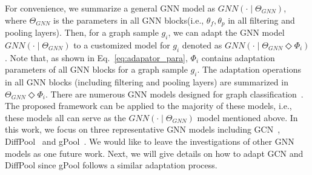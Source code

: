 \documentclass[11pt,dvipdfm]{article}
\begin{document}
For convenience, we summarize a general GNN model as $GNN(\cdot \mid\Theta_{GNN} )$, where $\Theta_{GNN}$ is the parameters in all GNN blocks(i.e., $\theta_f, \theta_p$ in all filtering and pooling layers). Then, for a graph sample $g_i$, we can adapt the GNN model  $GNN(\cdot \mid\Theta_{GNN} )$ to a customized model for $g_i$ denoted as $GNN(\cdot \mid\Theta_{GNN} \Diamond \Phi_i)$. Note that, as shown in Eq.~\eqref{eq:adapator_para}, $\Phi_i$ contains adaptation parameters of all GNN blocks for a graph sample $g_i$. The adaptation operations in all GNN blocks (including filtering and pooling layers) are summarized in $\Theta_{GNN} \Diamond \Phi_i$. There are numerous GNN models designed for graph classification~\cite{gao2019graph,ranjan2019asap,ma2019graph,Yuan2020StructPool:}. The proposed framework can be applied to the majority of these models, i.e., these models all can serve as the $GNN(\cdot \mid\Theta_{GNN} )$ model mentioned above. In this work, we focus on three representative GNN models including GCN~\cite{kipf2016semi}, DiffPool~\cite{ying2018hierarchical} and gPool~\cite{gao2019graph}. We would like to leave the investigations of other GNN models as one future work. Next, we will give details on how to adapt GCN and  DiffPool since gPool follows a similar adaptation process. 
\end{document}
